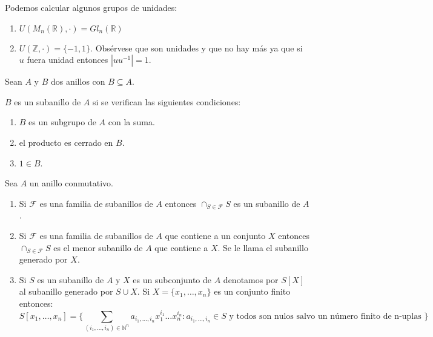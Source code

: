 \begin{example}
Podemos calcular algunos grupos de unidades:

\begin{enumerate}
\item $U(M_n(\mathbb{R}),\cdot) = Gl_n(\mathbb{R})$
\item $U(\mathbb{Z},\cdot) = \{-1,1\}$. Obsérvese que son unidades y que no hay más ya que si $u$ fuera unidad entonces $|uu^{-1}| = 1$.
\end{enumerate}
\end{example}

\begin{definition}[Subanillo]
Sean $A$ y $B$ dos anillos con $B \subseteq A$. 

$B$ es un subanillo de $A$ si se verifican las siguientes condiciones:

\begin{enumerate}
	\item $B$ es un subgrupo de $A$ con la suma. 
	\item el producto es cerrado en $B$.
	\item $1 \in B$. 
\end{enumerate} 
\end{definition}

\begin{proposition}
Sea $A$ un anillo conmutativo. 

\begin{enumerate}
\item Si $\mathcal{F}$ es una familia de subanillos de $A$ entonces $\cap_{S \in \mathcal{F}} S$ es un subanillo de $A$. 
\item Si $\mathcal{F}$ es una familia de subanillos de $A$ que contiene a un conjunto $X$ entonces $\cap_{S \in \mathcal{F}} S$ es el menor subanillo de $A$ que contiene a $X$. Se le llama el subanillo generado por $X$. 
\item Si $S$ es un subanillo de $A$ y $X$ es un subconjunto de $A$ denotamos por $S[X]$ al subanillo generado por $S \cup X$. Si $X = \{x_1,\ldots,x_n \}$ es un conjunto finito entonces: $$S[x_1,\ldots,x_n] = \{\sum_{(i_1,\ldots,i_n) \in \mathbb{N}^n} a_{i_1,\ldots,i_n} x_1^{i_1} \ldots x_n^{i_n}: a_{i_1,\ldots,i_n} \in S \text{ y todos son nulos salvo un número finito de n-uplas } \}$$
\end{enumerate}

\end{proposition}

